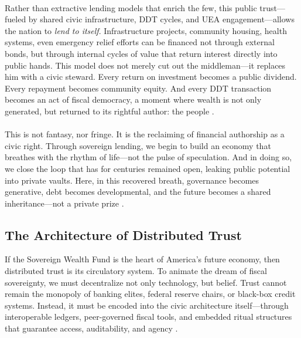 \documentclass[12pt]{article}
\begin{document}
\paragraph{}Rather than extractive lending models that enrich the few, this public trust—fueled by shared civic infrastructure, DDT cycles, and UEA engagement—allows the nation to \textit{lend to itself}. Infrastructure projects, community housing, health systems, even emergency relief efforts can be financed not through external bonds, but through internal cycles of value that return interest directly into public hands. This model does not merely cut out the middleman—it replaces him with a civic steward. Every return on investment becomes a public dividend. Every repayment becomes community equity. And every DDT transaction becomes an act of fiscal democracy, a moment where wealth is not only generated, but returned to its rightful author: the people \cite{graeber2011debt}.

\paragraph{}This is not fantasy, nor fringe. It is the reclaiming of financial authorship as a civic right. Through sovereign lending, we begin to build an economy that breathes with the rhythm of life—not the pulse of speculation. And in doing so, we close the loop that has for centuries remained open, leaking public potential into private vaults. Here, in this recovered breath, governance becomes generative, debt becomes developmental, and the future becomes a shared inheritance—not a private prize \cite{morris2014debt,bear2014navigating}.

\subsection{The Architecture of Distributed Trust}

If the Sovereign Wealth Fund is the heart of America’s future economy, then distributed trust is its circulatory system. To animate the dream of fiscal sovereignty, we must decentralize not only technology, but belief. Trust cannot remain the monopoly of banking elites, federal reserve chairs, or black-box credit systems. Instead, it must be encoded into the civic architecture itself—through interoperable ledgers, peer-governed fiscal tools, and embedded ritual structures that guarantee access, auditability, and agency \cite{lubell2015governing,spade2015normal}.
\end{document}
